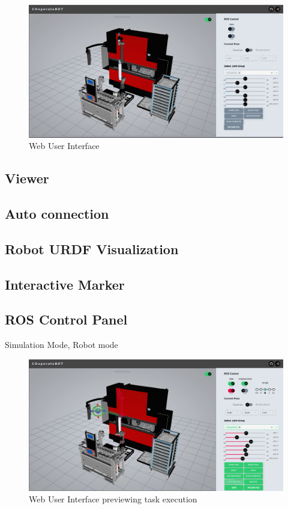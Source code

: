 
\begin{figure}[h]
    \centering
    \includegraphics[width=1\textwidth]{figures/webui/webui0.png}
    \caption{Web User Interface}
    \label{fig:web-ui}
\end{figure}

\subsection{Viewer}
\label{subsec:web-ui-viewer}


\subsection{Auto connection}
\label{subsec:web-ui-auto-connection}


\subsection{Robot URDF Visualization}
\label{subsec:web-ui-urdf-visualization}

\subsection{Interactive Marker}
\label{subsec:web-ui-interactive-marker}


\subsection{ROS Control Panel}
\label{subsec:web-ui-ros-control}
Simulation Mode, Robot mode


\begin{figure}[h]
    \centering
    \includegraphics[width=1\textwidth]{figures/webui/web-ui-preview.png}
    \caption{Web User Interface previewing task execution}
    \label{fig:web-ui-preview}
\end{figure}

